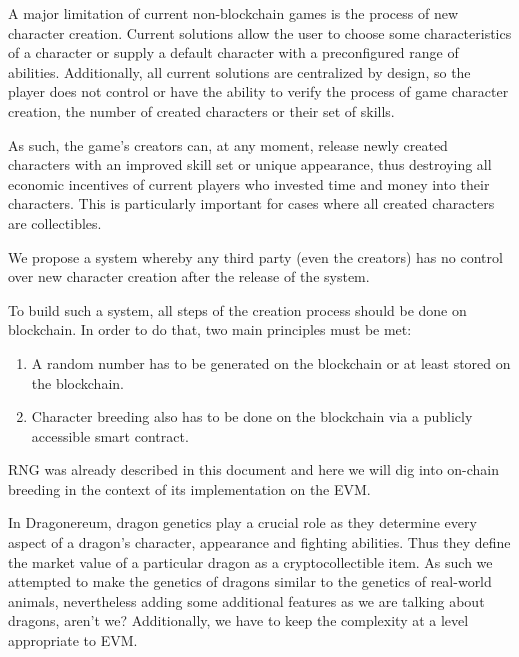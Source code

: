 \documentclass[12pt]{article}
\begin{document}
A major limitation of current non-blockchain games is the process of new character creation. Current solutions allow the user to choose some characteristics of a character or supply a default character with a preconfigured range of abilities. Additionally, all current solutions are centralized by design, so the player does not control or have the ability to verify the process of game character creation, the number of created characters or their set of skills.\par

As such, the game’s creators can, at any moment, release newly created characters with an improved skill set or unique appearance, thus destroying all economic incentives of current players who invested time and money into their characters. This is particularly important for cases where all created characters are collectibles.\par

We propose a system whereby any third party (even the creators) has no control over new character creation after the release of the system.\par

To build such a system, all steps of the creation process should be done on blockchain. In order to do that, two main principles must be met:\par

\begin{enumerate}
	\item A random number has to be generated on the blockchain or at least stored on the blockchain.\par

	\item Character breeding also has to be done on the blockchain via a publicly accessible smart contract.
\end{enumerate}\par

RNG was already described in this document and here we will dig into on-chain breeding in the context of its implementation on the EVM.\par

In Dragonereum, dragon genetics play a crucial role as they determine every aspect of a dragon’s character, appearance and fighting abilities. Thus they define the market value of a particular dragon as a cryptocollectible item. As such we attempted to make the genetics of dragons similar to the genetics of real-world animals, nevertheless adding some additional features as we are talking about dragons, aren’t we? Additionally, we have to keep the complexity at a level appropriate to EVM.\par
\end{document}
